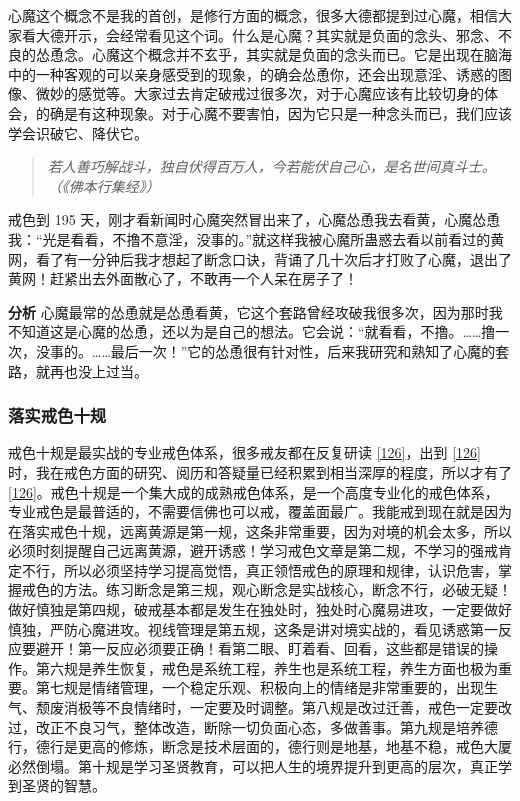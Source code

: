 心魔这个概念不是我的首创，是修行方面的概念，很多大德都提到过心魔，相信大家看大德开示，会经常看见这个词。什么是心魔？其实就是负面的念头、邪念、不良的怂恿念。心魔这个概念并不玄乎，其实就是负面的念头而已。它是出现在脑海中的一种客观的可以亲身感受到的现象，的确会怂恿你，还会出现意淫、诱惑的图像、微妙的感觉等。大家过去肯定破戒过很多次，对于心魔应该有比较切身的体会，的确是有这种现象。对于心魔不要害怕，因为它只是一种念头而已，我们应该学会识破它、降伏它。

\begin{quote}\it
    若人善巧解战斗，独自伏得百万人，今若能伏自己心，是名世间真斗士。（《佛本行集经》）
\end{quote}

\begin{case}
    戒色到 195 天，刚才看新闻时心魔突然冒出来了，心魔怂恿我去看黄，心魔怂恿我：“光是看看，不撸不意淫，没事的。”就这样我被心魔所蛊惑去看以前看过的黄网，看了有一分钟后我才想起了断念口诀，背诵了几十次后才打败了心魔，退出了黄网！赶紧出去外面散心了，不敢再一个人呆在房子了！

    \textbf{分析} 心魔最常的怂恿就是怂恿看黄，它这个套路曾经攻破我很多次，因为那时我不知道这是心魔的怂恿，还以为是自己的想法。它会说：“就看看，不撸。……撸一次，没事的。……最后一次！”它的怂恿很有针对性，后来我研究和熟知了心魔的套路，就再也没上过当。
\end{case}

\subsubsection{落实戒色十规}

戒色十规是最实战的专业戒色体系，很多戒友都在反复研读 \ref{126}，出到 \ref{126} 时，我在戒色方面的研究、阅历和答疑量已经积累到相当深厚的程度，所以才有了 \ref{126}。戒色十规是一个集大成的成熟戒色体系，是一个高度专业化的戒色体系，专业戒色是最普适的，不需要信佛也可以戒，覆盖面最广。我能戒到现在就是因为在落实戒色十规，远离黄源是第一规，这条非常重要，因为对境的机会太多，所以必须时刻提醒自己远离黄源，避开诱惑！学习戒色文章是第二规，不学习的强戒肯定不行，所以必须坚持学习提高觉悟，真正领悟戒色的原理和规律，认识危害，掌握戒色的方法。练习断念是第三规，观心断念是实战核心，断念不行，必破无疑！做好慎独是第四规，破戒基本都是发生在独处时，独处时心魔易进攻，一定要做好慎独，严防心魔进攻。视线管理是第五规，这条是讲对境实战的，看见诱惑第一反应要避开！第一反应必须要正确！看第二眼、盯着看、回看，这些都是错误的操作。第六规是养生恢复，戒色是系统工程，养生也是系统工程，养生方面也极为重要。第七规是情绪管理，一个稳定乐观、积极向上的情绪是非常重要的，出现生气、颓废消极等不良情绪时，一定要及时调整。第八规是改过迁善，戒色一定要改过，改正不良习气，整体改造，断除一切负面心态，多做善事。第九规是培养德行，德行是更高的修炼，断念是技术层面的，德行则是地基，地基不稳，戒色大厦必然倒塌。第十规是学习圣贤教育，可以把人生的境界提升到更高的层次，真正学到圣贤的智慧。

